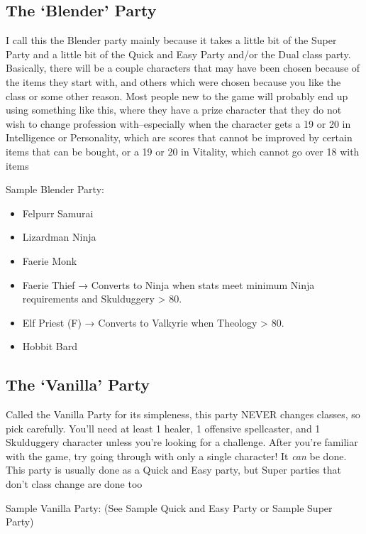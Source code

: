 \documentclass[12pt]{article}
\providecommand{\tightlist}{%
  \setlength{\itemsep}{0pt}\setlength{\parskip}{0pt}}
\begin{document}
\subsection{\texorpdfstring{The `Blender'
Party}{The Blender Party}}\label{the-blender-party}

I call this the Blender party mainly because it takes a little bit of
the Super Party and a little bit of the Quick and Easy Party and/or the
Dual class party. Basically, there will be a couple characters that may
have been chosen because of the items they start with, and others which
were chosen because you like the class or some other reason. Most people
new to the game will probably end up using something like this, where
they have a prize character that they do not wish to change profession
with--especially when the character gets a 19 or 20 in Intelligence or
Personality, which are scores that cannot be improved by certain items
that can be bought, or a 19 or 20 in Vitality, which cannot go over 18
with items

Sample Blender Party:

\begin{itemize}
\tightlist
\item
  Felpurr Samurai
\item
  Lizardman Ninja
\item
  Faerie Monk
\item
  Faerie Thief → Converts to Ninja when stats meet minimum Ninja
  requirements and Skulduggery \textgreater{} 80.
\item
  Elf Priest (F) → Converts to Valkyrie when Theology \textgreater{} 80.
\item
  Hobbit Bard
\end{itemize}

\subsection{\texorpdfstring{The `Vanilla'
Party}{The Vanilla Party}}\label{the-vanilla-party}

Called the Vanilla Party for its simpleness, this party \textsc{NEVER}
changes classes, so pick carefully. You'll need at least 1 healer, 1
offensive spellcaster, and 1 Skulduggery character unless you're looking for
a challenge. After you're familiar with the game, try going through with only
a single character! It \emph{can} be done. This party is usually done as a
Quick and Easy party, but Super parties that don't class change are done too

Sample Vanilla Party: (See Sample Quick and Easy Party or Sample Super
Party)
\end{document}
